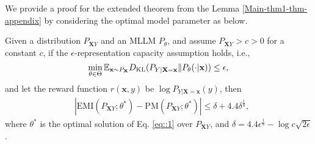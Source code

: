 We provide a proof for the extended theorem from the Lemma \ref{Main-thm1-thm-appendix} by considering the optimal model parameter as below.
\begin{theorem}\label{Main-thm1-thm-appendix}
    Given a distribution $P_{\mathbf{X}Y}$ and an MLLM $P_{\theta}$, and assume $P_{\mathbf{X}Y}>c>0$ for a constant $c$, if the $\epsilon$-representation capacity assumption holds, i.e.,
\begin{equation}\label{Expression-appendix}
    \min_{\theta\in \Theta} \mathbb{E}_{\mathbf{x}\sim P_{\mathbf{X}}} D_{\rm KL}(P_{Y|\mathbf{X}=\mathbf{x}}\| P_{\theta}(\cdot|\mathbf{x}) ) \leq \epsilon,
\end{equation}
and let the reward function $r(\mathbf{x},y)$ be $\log P_{Y|\mathbf{X}=\mathbf{x}}(y)$, then
\begin{equation*}
    \begin{split}
        &|\text{EMI}(P_{\mathbf{X}Y};\theta^*) - \text{PM}(P_{\mathbf{X}Y};\theta^*)| \leq \delta + 4.4 \delta^{\frac{1}{8}}, \nonumber
    \end{split}
    \end{equation*}
    \vspace{-0.2em}
    where $\theta^*$ is the optimal solution of Eq. \eqref{eq::1} over $P_{\mathbf{X}Y}$, and $\delta = 4.4\epsilon^{\frac{1}{8}} - \log c \sqrt{2\epsilon}$.
\end{theorem}
